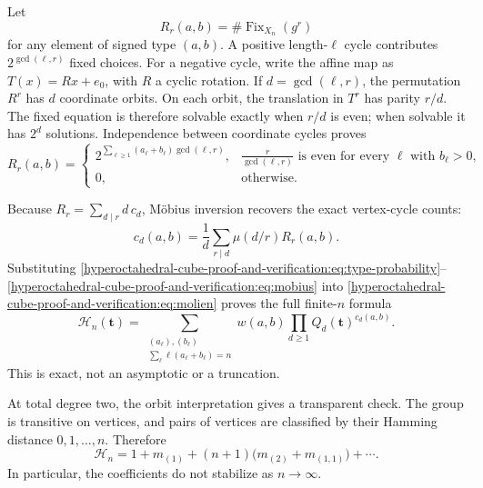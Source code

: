 \documentclass[10pt]{article}
\newcommand{\Fix}{\operatorname{Fix}}
\begin{document}
Let
\[
R_r(a,b)=\#\Fix_{X_n}(g^r)
\]
for any element of signed type $(a,b)$.  A positive length-$\ell$ cycle
contributes $2^{\gcd(\ell,r)}$ fixed choices.  For a negative cycle, write the
affine map as $T(x)=Rx+e_0$, with $R$ a cyclic rotation.  If
$d=\gcd(\ell,r)$, the permutation $R^r$ has $d$ coordinate orbits.  On each
orbit, the translation in $T^r$ has parity $r/d$.  The fixed equation is
therefore solvable exactly when $r/d$ is even; when solvable it has $2^d$
solutions.  Independence between coordinate cycles proves
\begin{equation}\label{hyperoctahedral-cube-proof-and-verification:eq:fixed-powers}
R_r(a,b)=
\begin{cases}
\displaystyle
2^{\sum_{\ell\geq1}(a_\ell+b_\ell)\gcd(\ell,r)},
&\displaystyle
\frac r{\gcd(\ell,r)}\text{ is even for every }\ell\text{ with }b_\ell>0,
\\[8pt]
0,&\text{otherwise}.
\end{cases}
\end{equation}

Because $R_r=\sum_{d\mid r}d\,c_d$, Möbius inversion recovers the exact
vertex-cycle counts:
\begin{equation}\label{hyperoctahedral-cube-proof-and-verification:eq:mobius}
c_d(a,b)=\frac1d\sum_{r\mid d}\mu(d/r)R_r(a,b).
\end{equation}
Substituting \eqref{hyperoctahedral-cube-proof-and-verification:eq:type-probability}--\eqref{hyperoctahedral-cube-proof-and-verification:eq:mobius} into
\eqref{hyperoctahedral-cube-proof-and-verification:eq:molien} proves the full finite-$n$ formula
\begin{equation}\label{hyperoctahedral-cube-proof-and-verification:eq:full-formula}
\boxed{
\mathcal H_n(\mathbf t)=
\sum_{\substack{(a_\ell),(b_\ell)\\
\sum_\ell\ell(a_\ell+b_\ell)=n}}
w(a,b)\prod_{d\geq1}Q_d(\mathbf t)^{c_d(a,b)}.
}
\end{equation}
This is exact, not an asymptotic or a truncation.

At total degree two, the orbit interpretation gives a transparent check.
The group is transitive on vertices, and pairs of vertices are classified by
their Hamming distance $0,1,\ldots,n$.  Therefore
\begin{equation}\label{hyperoctahedral-cube-proof-and-verification:eq:degree-two}
\mathcal H_n
=1+m_{(1)}+(n+1)\bigl(m_{(2)}+m_{(1,1)}\bigr)+\cdots.
\end{equation}
In particular, the coefficients do not stabilize as $n\to\infty$.
\end{document}
